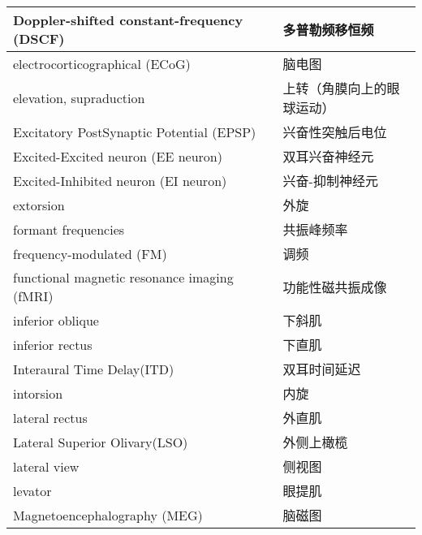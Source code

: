 \begin{longtable}{lll}
	\midrule
	Doppler-shifted constant-frequency (DSCF)     &&  多普勒频移恒频  \\
	
	\midrule
	electrocorticographical (ECoG)     &&  脑电图  \\
	
	\midrule
	elevation, supraduction     &&  上转（角膜向上的眼球运动）  \\
	
	\midrule
	Excitatory PostSynaptic Potential (EPSP)     &&  兴奋性突触后电位  \\
	
	\midrule
	Excited-Excited neuron (EE neuron)     &&  双耳兴奋神经元  \\
	
	\midrule
	Excited-Inhibited neuron (EI neuron)     && 兴奋-抑制神经元   \\
	
	\midrule
	extorsion     && 外旋   \\
	
	\midrule
	formant frequencies     &&  共振峰频率  \\
	
	\midrule
	frequency-modulated (FM)     &&  调频  \\
	
	\midrule
	functional magnetic resonance imaging (fMRI)     &&  功能性磁共振成像  \\
	
	\midrule
	inferior oblique   && 下斜肌  \\
	
	\midrule
	inferior rectus   && 下直肌  \\
	
	\midrule
	Interaural Time Delay(ITD)   && 双耳时间延迟  \\
	
	\midrule
	intorsion   && 内旋  \\
	
	\midrule
	lateral rectus   && 外直肌  \\
	
	\midrule
	Lateral Superior Olivary(LSO)   && 外侧上橄榄  \\
	
	\midrule
	lateral view   && 侧视图  \\
	
	\midrule
	levator   && 眼提肌  \\
		
	\midrule
	Magnetoencephalography (MEG)   && 脑磁图  \\
	

\end{longtable}
